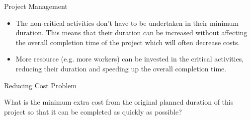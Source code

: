 \documentclass[8pt]{beamer}
\begin{document}
\begin{frame}{Project Management}
	\begin{itemize}
		\item The non-critical activities don’t have to be undertaken in their minimum duration. This
means that their duration can be increased without affecting the overall completion
time of the project which will often decrease costs.
\item More resource (e.g. more workers) can be invested in the critical activities, reducing
their duration and speeding up the overall completion time.
	\end{itemize}
\end{frame}

\begin{frame}{Reducing Cost Problem}
	\begin{problem}
		What is the minimum extra cost from the original planned duration of this project so that it can be completed as quickly as possible?

		

	
	\end{problem}

\end{frame}
\end{document}
